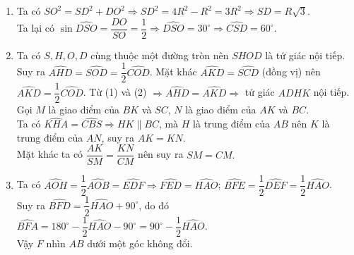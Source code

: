 \begin{bt}
{\begin{enumerate}
			\item Ta có $SO^2=SD^2+DO^2 \Rightarrow SD^2=4R^2-R^2 =3R^2 \Rightarrow SD = R\sqrt{3}$. \\
			Ta lại có $\sin \widehat{DSO} = \dfrac{DO}{SO} = \dfrac{1}{2} \Rightarrow \widehat{DSO} = 30^\circ \Rightarrow \widehat{CSD} = 60^\circ.$
			\item Ta có $S,H,O,D$ cùng thuộc một đường tròn nên $SHOD$ là tứ giác nội tiếp. \\
			Suy ra $\widehat{AHD} = \widehat{SOD} = \dfrac{1}{2} \widehat{COD}$. 
			Mặt khác $\widehat{AKD} = \widehat{SCD}$ (đồng vị) nên $\widehat{AKD} = \dfrac{1}{2} \widehat{COD}$. 
			Từ (1) và (2) $\Rightarrow \widehat{AHD}= \widehat{AKD} \Rightarrow$ tứ giác $ADHK$ nội tiếp. \\
			Gọi $M$ là giao điểm của $BK$ và $SC$, $N$ là giao điểm của $AK$ và $BC$.\\
			Ta có $\widehat{KHA} =\widehat{CBS} \Rightarrow HK \parallel BC$, mà $H$ là trung điểm của $AB$ nên $K$ là trung điểm của $AN$, suy ra $AK=KN$. \\
			Mặt khác ta có $\dfrac{AK}{SM} = \dfrac{KN}{CM}$ nên suy ra $SM=CM.$
			\item Ta có $\widehat{AOH} = \dfrac{1}{2} \widehat{AOB}  =\widehat{EDF} \Rightarrow \widehat{FED} =\widehat{HAO}$;  $\widehat{BFE} = \dfrac{1}{2}\widehat{DEF} = \dfrac{1}{2}\widehat{HAO}$. \\
			Suy ra $\widehat{BFD} = \dfrac{1}{2} \widehat{HAO} +90^\circ$, do đó  $\widehat{BFA} = 180^\circ -\dfrac{1}{2} \widehat{HAO} -90^\circ =90^\circ -\dfrac{1}{2} \widehat{HAO}$. \\
			Vậy $F$ nhìn $AB$ dưới một góc không đổi.
		\end{enumerate}
	}
\end{bt}

